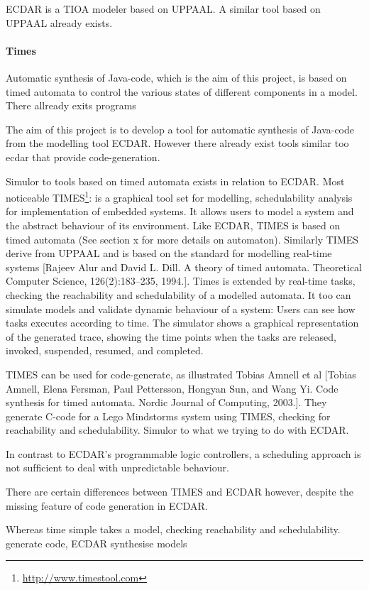 ECDAR is a TIOA modeler based on UPPAAL. A similar tool based on UPPAAL already
exists.

\paragraph{Times}
Automatic synthesis of Java-code, which is the aim of this project, is based on timed automata to control the various states of different components in a model. There allready exits programs

The aim of this project is to develop a tool for automatic synthesis of Java-code from the modelling tool ECDAR. However there already exist tools similar too ecdar that provide code-generation.

Simulor to tools based on timed automata exists in relation to ECDAR. Most noticeable TIMES\footnote{\url{http://www.timestool.com}}: is a graphical tool set for modelling, schedulability analysis for implementation of embedded systems. It allows users to model a system and the abstract behaviour of its environment. 
Like ECDAR, TIMES is based on timed automata (See section x for more details on automaton). Similarly TIMES derive from UPPAAL and is based on the standard for modelling real-time systems [Rajeev Alur and David L. Dill. A theory of timed automata. Theoretical Computer
Science, 126(2):183–235, 1994.].
Times is extended by real-time tasks, checking the reachability and schedulability of a modelled automata. It too can simulate models and validate dynamic behaviour of a system: Users can see how tasks executes according to time. The simulator shows a graphical representation of the generated trace, showing the time points when the tasks are released, invoked, suspended, resumed, and completed.

TIMES can be used for code-generate, as illustrated Tobias Amnell et al [Tobias Amnell, Elena Fersman, Paul Pettersson, Hongyan Sun, and Wang Yi. Code
synthesis for timed automata. Nordic Journal of Computing, 2003.]. They generate C-code for a Lego Mindstorms system using TIMES, checking for reachability and schedulability. Simulor to what we trying to do with ECDAR. 

In contrast to ECDAR's programmable logic controllers, a scheduling approach is not sufﬁcient to deal with unpredictable behaviour.

There are certain differences between TIMES and ECDAR however, despite the missing feature of code generation in ECDAR. 

Whereas time simple takes a model, checking reachability and schedulability. generate code, ECDAR synthesise models
 

